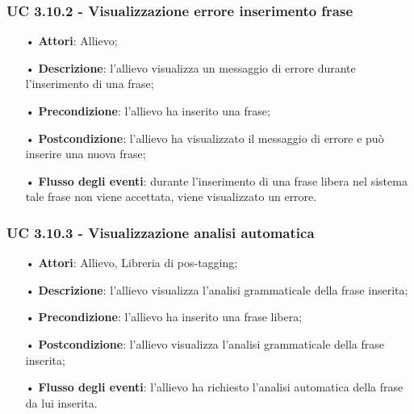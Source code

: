 \subsubsection{UC 3.10.2 - Visualizzazione errore inserimento frase}
\begin{itemize}
	\item[•]\textbf{Attori}: Allievo;
	\item[•]\textbf{Descrizione}: l'allievo visualizza un messaggio di errore durante l'inserimento di una frase;
	\item[•]\textbf{Precondizione}: l'allievo ha inserito una frase;
	\item[•]\textbf{Postcondizione}: l'allievo ha visualizzato il messaggio di errore e può inserire una nuova frase;
	\item[•]\textbf{Flusso degli eventi}: durante l'inserimento di una frase libera nel sistema tale frase non viene accettata, viene visualizzato un errore.
\end{itemize}

\subsubsection{UC 3.10.3 - Visualizzazione analisi automatica}
\begin{itemize}
	\item[•]\textbf{Attori}: Allievo, Libreria di pos-tagging;
	\item[•]\textbf{Descrizione}: l'allievo visualizza l'analisi grammaticale della frase inserita;
	\item[•]\textbf{Precondizione}: l'allievo ha inserito una frase libera;
	\item[•]\textbf{Postcondizione}: l'allievo visualizza l'analisi grammaticale della frase inserita;
	\item[•]\textbf{Flusso degli eventi}: l'allievo ha richiesto l'analisi automatica della frase da lui inserita.
\end{itemize}

